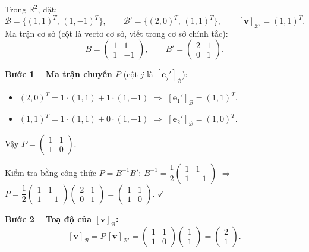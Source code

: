 \documentclass[12pt,a4paper]{article}
\begin{document}
\begin{vidu}[title={Đổi cơ sở khi \emph{cả hai} cơ sở đều không phải chính tắc}]
Trong $\mathbb{R}^2$, đặt:
\[
  \mathcal{B} = \{(1, 1)^T,\, (1, -1)^T\},\qquad
  \mathcal{B}' = \{(2, 0)^T,\, (1, 1)^T\},\qquad
  \mathbf{[v]_{\mathcal{B}'}} = (1, 1)^T.
\]
Ma trận cơ sở (cột là vectơ cơ sở, viết trong cơ sở chính tắc):
\[
  B = \begin{pmatrix}1 & 1\\ 1 & -1\end{pmatrix},\qquad
  B' = \begin{pmatrix}2 & 1\\ 0 & 1\end{pmatrix}.
\]

\textbf{Bước 1 -- Ma trận chuyển $P$} (cột $j$ là $[\mathbf{e}_j']_{\mathcal{B}}$):
\begin{itemize}
  \item $(2, 0)^T = 1\cdot(1,1) + 1\cdot(1,-1)$ $\Rightarrow$ $[\mathbf{e}_1']_{\mathcal{B}} = (1, 1)^T$.
  \item $(1, 1)^T = 1\cdot(1,1) + 0\cdot(1,-1)$ $\Rightarrow$ $[\mathbf{e}_2']_{\mathcal{B}} = (1, 0)^T$.
\end{itemize}
Vậy $P = \begin{pmatrix}1 & 1\\ 1 & 0\end{pmatrix}$.

Kiểm tra bằng công thức $P = B^{-1}B'$:
$B^{-1} = \dfrac{1}{2}\begin{pmatrix}1 & 1\\ 1 & -1\end{pmatrix}$ $\Rightarrow$
$P = \dfrac{1}{2}\begin{pmatrix}1 & 1\\ 1 & -1\end{pmatrix}\begin{pmatrix}2 & 1\\ 0 & 1\end{pmatrix}
= \begin{pmatrix}1 & 1\\ 1 & 0\end{pmatrix}$. $\checkmark$

\textbf{Bước 2 -- Toạ độ của $\mathbf{[v]_{\mathcal{B}}}$:}
\[
  [\mathbf{v}]_{\mathcal{B}}
  = P\,[\mathbf{v}]_{\mathcal{B}'}
  = \begin{pmatrix}1 & 1\\ 1 & 0\end{pmatrix}\begin{pmatrix}1\\ 1\end{pmatrix}
  = \begin{pmatrix}2\\ 1\end{pmatrix}.
\]
\end{vidu}
\end{document}
